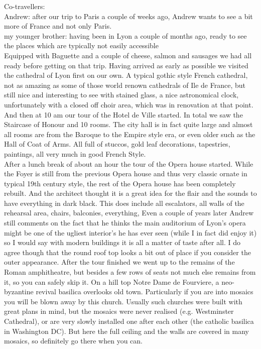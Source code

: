 Co-travellers:\\
Andrew: after our trip to Paris a couple of weeks ago, Andrew wants to see a bit more of France and not only Paris.\\
my younger brother: having been in Lyon a couple of months ago, ready to see the places which are typically not easily accessible\\

Equipped with Baguette and a couple of cheese, salmon and sausages we had all ready before getting on that trip. Having arrived as early as possible we visited the cathedral of Lyon first on our own. A typical gothic style French cathedral, not as amazing as some of those world renown cathedrals of Ile de France, but still nice and interesting to see with stained glass, a nice astronomical clock, unfortunately with a closed off choir area, which was in renovation at that point. And then at 10 am our tour of the Hotel de Ville started. In total we saw the Staircase of Honour and 10 rooms. The city hall is in fact quite large and almost all rooms are from the Baroque to the Empire style era, or even older such as the Hall of Coat of Arms. All full of stuccos, gold leaf decorations, tapestries, paintings, all very much in good French Style. \\
After a lunch break of about an hour the tour of the Opera house started. While the Foyer is still from the previous Opera house and thus very classic ornate in typical 19th century style, the rest of the Opera house has been completely rebuilt. And the architect thought it is a great idea for the flair and the sounds to have everything in dark black. This does include all escalators, all walls of the rehearsal area, chairs, balconies, everything, Even a couple of years later Andrew still comments on the fact that he thinks the main auditorium of Lyon's opera might be one of the ugliest interior's he has ever seen (while I in fact did enjoy it) so I would say with modern buildings it is all a matter of taste after all. I do agree though that the round roof top looks a bit out of place if you consider the outer appearance. After the tour finished we went up to the remains of the Roman amphitheatre, but besides a few rows of seats not much else remains from it, so you can safely skip it. On a hill top Notre Dame de Fourviere, a neo-byzantine revival basilica overlooks old town. Particularly if you are into mosaics you will be blown away by this church. Usually such churches were built with great plans in mind, but the mosaics were never realised (e.g. Westminster Cathedral), or are very slowly installed one after each other (the catholic basilica in Washington DC). But here the full ceiling and the walls are covered in many mosaics, so definitely go there when you can. \\
